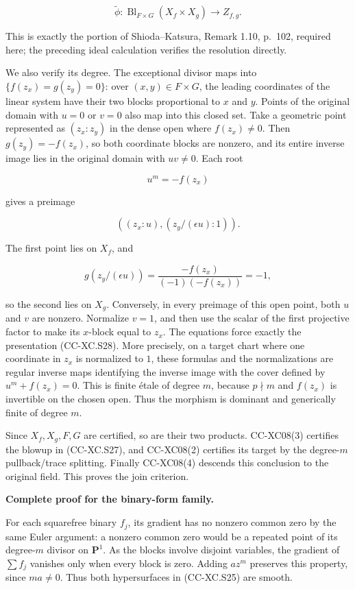 \[
 \widetilde\phi:\operatorname{Bl}_{F\times G}(X_f\times X_g)
                     \longrightarrow Z_{f,g}.
 \tag{CC-XC.S27}
\]

This is exactly the portion of Shioda--Katsura, Remark 1.10, p.~102,
required here; the preceding ideal calculation verifies the resolution
directly.

We also verify its degree. The exceptional divisor maps into
\(\{f(z_x)=g(z_y)=0\}\): over \((x,y)\in F\times G\), the leading
coordinates of the linear system have their two blocks proportional to
\(x\) and \(y\). Points of the original domain with \(u=0\) or \(v=0\)
also map into this closed set. Take a geometric point represented as
\((z_x:z_y)\) in the dense open where \(f(z_x)\ne0\). Then
\(g(z_y)=-f(z_x)\), so both coordinate blocks are nonzero, and its
entire inverse image lies in the original domain with \(uv\ne0\). Each
root

\[
 u^m=-f(z_x)
\]

gives a preimage

\[
 ((z_x:u),(z_y/(\epsilon u):1)).
 \tag{CC-XC.S28}
\]

The first point lies on \(X_f\), and

\[
 g(z_y/(\epsilon u))
 =\frac{-f(z_x)}{(-1)(-f(z_x))}=-1,
\]

so the second lies on \(X_g\). Conversely, in every preimage of this
open point, both \(u\) and \(v\) are nonzero. Normalize \(v=1\), and
then use the scalar of the first projective factor to make its
\(x\)-block equal to \(z_x\). The equations force exactly the
presentation (CC-XC.S28). More precisely, on a target chart where one
coordinate in \(z_x\) is normalized to \(1\), these formulas and the
normalizations are regular inverse maps identifying the inverse image
with the cover defined by \(u^m+f(z_x)=0\). This is finite étale of
degree \(m\), because \(p\nmid m\) and \(f(z_x)\) is invertible on the
chosen open. Thus the morphism is dominant and generically finite of
degree \(m\).

Since \(X_f,X_g,F,G\) are certified, so are their two products.
CC-XC08(3) certifies the blowup in (CC-XC.S27), and CC-XC08(2) certifies
its target by the degree-\(m\) pullback/trace splitting. Finally
CC-XC08(4) descends this conclusion to the original field. This proves
the join criterion.

\textbf{Complete proof for the binary-form family.}

For each squarefree binary \(f_j\), its gradient has no nonzero common
zero by the same Euler argument: a nonzero common zero would be a
repeated point of its degree-\(m\) divisor on \(\mathbf P^1\). As the
blocks involve disjoint variables, the gradient of \(\sum f_j\) vanishes
only when every block is zero. Adding \(a z^m\) preserves this property,
since \(ma\ne0\). Thus both hypersurfaces in (CC-XC.S25) are smooth.

